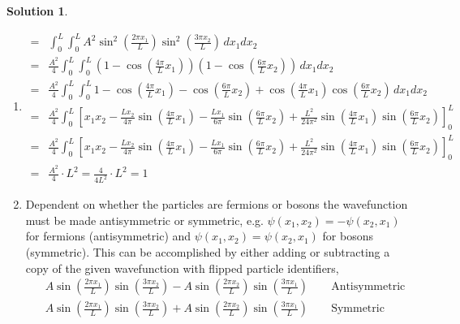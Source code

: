 \documentclass[10pt]{article}
\theoremstyle{definition}
\newtheorem{soln}{Solution}
\begin{document}
\begin{soln}~
  \begin{enumerate}[label=(\alph*)]
    \item \begin{align*}
            = & \int_{0}^{L}\int_{0}^{L}A^2\sin^2\left(\frac{2\pi x_1}{L}\right)\sin^2\left(\frac{3\pi x_2}{L}\right)\,dx_1dx_2                                                                             \\
            = & \frac{A^2}{4}\int_{0}^{L}\int_{0}^{L}\left(1-\cos\left(\frac{4\pi}{L}x_1\right)\right)\left(1-\cos\left(\frac{6\pi}{L}x_2\right)\right)\,dx_1dx_2                                           \\
            = & \frac{A^2}{4}\int_{0}^{L}\int_{0}^{L}1-\cos\left(\frac{4\pi}{L}x_1\right)-\cos\left(\frac{6\pi}{L}x_2\right)+\cos\left(\frac{4\pi}{L}x_1\right)\cos\left(\frac{6\pi}{L}x_2\right)\,dx_1dx_2 \\
            = & \frac{A^2}{4}\int_{0}^{L}\left[x_1x_2-\frac{Lx_2}{4\pi}\sin\left(\frac{4\pi}{L}x_1\right)
              -\frac{Lx_1}{6\pi}\sin\left(\frac{6\pi}{L}x_2\right)
              + \frac{L^2}{24\pi^2}\sin\left(\frac{4\pi}{L}x_1\right)\sin\left(\frac{6\pi}{L}x_2\right)
            \right]_0^L                                                                                                                                                                                     \\
            = & \frac{A^2}{4}\int_{0}^{L}\left[x_1x_2-\frac{Lx_2}{4\pi}\sin\left(\frac{4\pi}{L}x_1\right)
              -\frac{Lx_1}{6\pi}\sin\left(\frac{6\pi}{L}x_2\right)
              + \frac{L^2}{24\pi^2}\sin\left(\frac{4\pi}{L}x_1\right)\sin\left(\frac{6\pi}{L}x_2\right)
            \right]_0^L                                                                                                                                                                                     \\
            = & \frac{A^2}{4}\cdot L^2=\frac{4}{4L^2}\cdot L^2=1
          \end{align*}
    \item Dependent on whether the particles are fermions or bosons the wavefunction must be made antisymmetric or symmetric,
          e.g. $\psi(x_1,x_2)=-\psi(x_2,x_1)$ for fermions (antisymmetric) and $\psi(x_1,x_2)=\psi(x_2,x_1)$ for bosons (symmetric).
          This can be accomplished by either adding or subtracting a copy of the given wavefunction with flipped particle identifiers,
          \begin{align*}
             & A\sin\left(\frac{2\pi x_1}{L}\right)\sin\left(\frac{3\pi x_2}{L}\right)-A\sin\left(\frac{2\pi x_2}{L}\right)\sin\left(\frac{3\pi x_1}{L}\right)\qquad\text{Antisymmetric} \\
             & A\sin\left(\frac{2\pi x_1}{L}\right)\sin\left(\frac{3\pi x_2}{L}\right)+A\sin\left(\frac{2\pi x_2}{L}\right)\sin\left(\frac{3\pi x_1}{L}\right)\qquad\text{Symmetric}
          \end{align*}
  \end{enumerate}
\end{soln}
\end{document}
